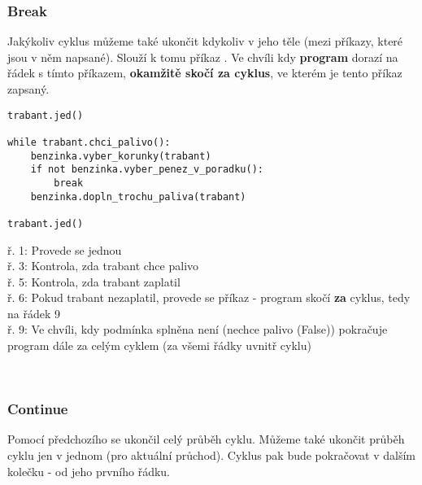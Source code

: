 \subsubsection{Break}
Jakýkoliv cyklus můžeme také ukončit kdykoliv v jeho těle (mezi příkazy, které jsou v něm napsané). Slouží k tomu příkaz \textbf{}. Ve chvíli kdy \textbf{program} dorazí na řádek s tímto příkazem, \textbf{okamžitě skočí za cyklus}, ve kterém je tento příkaz zapsaný.\\
\begin{minipage}[t]{.45\textwidth}
\begin{code}
\begin{verbatim}
trabant.jed()

while trabant.chci_palivo():
	benzinka.vyber_korunky(trabant)
	if not benzinka.vyber_penez_v_poradku():
		break
	benzinka.dopln_trochu_paliva(trabant)
	
trabant.jed()	
\end{verbatim}

\label{code:break}
\end{code}
\end{minipage}
\begin{minipage}[t]{.45\textwidth}
\vspace{3cm}
ř. 1:	Provede se jednou\\
ř. 3:	Kontrola, zda trabant chce palivo\\
ř. 5:	Kontrola, zda trabant zaplatil\\
ř. 6:	Pokud trabant nezaplatil, provede se příkaz  - program skočí \textbf{za} cyklus, tedy na řádek 9\\
ř. 9:	Ve chvíli, kdy podmínka splněna není (nechce palivo (False)) pokračuje program dále za celým cyklem (za všemi řádky uvnitř cyklu)
\end{minipage}\\

\subsubsection{Continue}
Pomocí předchozího  se ukončil celý průběh cyklu. Můžeme také ukončit průběh cyklu jen v jednom  (pro aktuální průchod). Cyklus pak bude pokračovat v dalším kolečku - od jeho prvního řádku.\\


